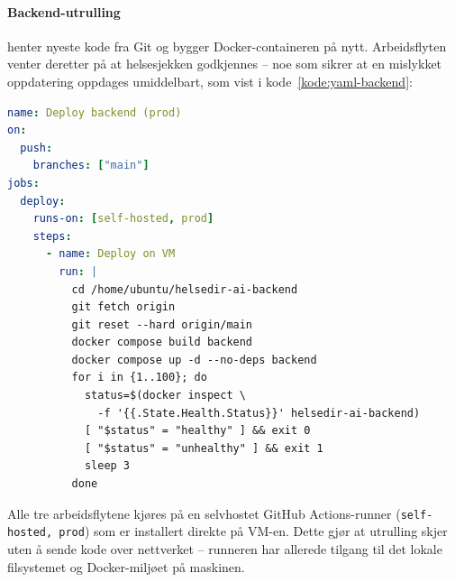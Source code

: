 \paragraph{Backend-utrulling} henter nyeste kode fra Git og bygger
Docker-containeren på nytt. Arbeidsflyten venter deretter på at helsesjekken
godkjennes -- noe som sikrer at en mislykket oppdatering oppdages umiddelbart,
som vist i kode~\ref{kode:yaml-backend}:

\begin{lstlisting}[language=yaml,
    caption={GitHub Actions: Utrulling av backend},
    label={kode:yaml-backend}]
name: Deploy backend (prod)
on:
  push:
    branches: ["main"]
jobs:
  deploy:
    runs-on: [self-hosted, prod]
    steps:
      - name: Deploy on VM
        run: |
          cd /home/ubuntu/helsedir-ai-backend
          git fetch origin
          git reset --hard origin/main
          docker compose build backend
          docker compose up -d --no-deps backend
          for i in {1..100}; do
            status=$(docker inspect \
              -f '{{.State.Health.Status}}' helsedir-ai-backend)
            [ "$status" = "healthy" ] && exit 0
            [ "$status" = "unhealthy" ] && exit 1
            sleep 3
          done
\end{lstlisting}

Alle tre arbeidsflytene kjøres på en selvhostet GitHub Actions-runner
(\texttt{self-hosted, prod}) som er installert direkte på VM-en. Dette gjør at
utrulling skjer uten å sende kode over nettverket -- runneren har allerede tilgang
til det lokale filsystemet og Docker-miljøet på maskinen.

